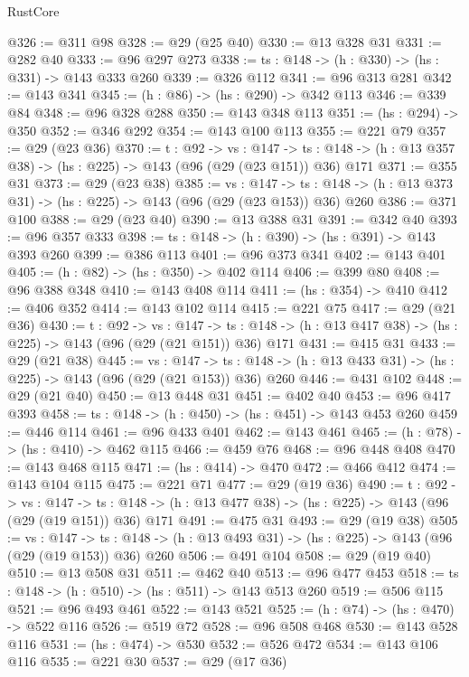 \begin{lexlean}{RustCore}
\begin{coremodule}
{\begin{coremodule}
{{{@326 := @311 @98
@328 := @29 (@25 @40)
@330 := @13 @328 @31
@331 := @282 @40
@333 := @96 @297 @273
@338 := {ts : @148} -> (h : @330) -> (hs : @331) -> @143 @333 @260
@339 := @326 @112
@341 := @96 @313 @281
@342 := @143 @341
@345 := (h : @86) -> (hs : @290) -> @342 @113
@346 := @339 @84
@348 := @96 @328 @288
@350 := @143 @348 @113
@351 := (hs : @294) -> @350
@352 := @346 @292
@354 := @143 @100 @113
@355 := @221 @79
@357 := @29 (@23 @36)
@370 := {t : @92} ->
  {vs : @147} ->
  {ts : @148} -> (h : @13 @357 @38) -> (hs : @225) -> @143 (@96 (@29 (@23 @151)) @36) @171
@371 := @355 @31
@373 := @29 (@23 @38)
@385 := {vs : @147} ->
  {ts : @148} -> (h : @13 @373 @31) -> (hs : @225) -> @143 (@96 (@29 (@23 @153)) @36) @260
@386 := @371 @100
@388 := @29 (@23 @40)
@390 := @13 @388 @31
@391 := @342 @40
@393 := @96 @357 @333
@398 := {ts : @148} -> (h : @390) -> (hs : @391) -> @143 @393 @260
@399 := @386 @113
@401 := @96 @373 @341
@402 := @143 @401
@405 := (h : @82) -> (hs : @350) -> @402 @114
@406 := @399 @80
@408 := @96 @388 @348
@410 := @143 @408 @114
@411 := (hs : @354) -> @410
@412 := @406 @352
@414 := @143 @102 @114
@415 := @221 @75
@417 := @29 (@21 @36)
@430 := {t : @92} ->
  {vs : @147} ->
  {ts : @148} -> (h : @13 @417 @38) -> (hs : @225) -> @143 (@96 (@29 (@21 @151)) @36) @171
@431 := @415 @31
@433 := @29 (@21 @38)
@445 := {vs : @147} ->
  {ts : @148} -> (h : @13 @433 @31) -> (hs : @225) -> @143 (@96 (@29 (@21 @153)) @36) @260
@446 := @431 @102
@448 := @29 (@21 @40)
@450 := @13 @448 @31
@451 := @402 @40
@453 := @96 @417 @393
@458 := {ts : @148} -> (h : @450) -> (hs : @451) -> @143 @453 @260
@459 := @446 @114
@461 := @96 @433 @401
@462 := @143 @461
@465 := (h : @78) -> (hs : @410) -> @462 @115
@466 := @459 @76
@468 := @96 @448 @408
@470 := @143 @468 @115
@471 := (hs : @414) -> @470
@472 := @466 @412
@474 := @143 @104 @115
@475 := @221 @71
@477 := @29 (@19 @36)
@490 := {t : @92} ->
  {vs : @147} ->
  {ts : @148} -> (h : @13 @477 @38) -> (hs : @225) -> @143 (@96 (@29 (@19 @151)) @36) @171
@491 := @475 @31
@493 := @29 (@19 @38)
@505 := {vs : @147} ->
  {ts : @148} -> (h : @13 @493 @31) -> (hs : @225) -> @143 (@96 (@29 (@19 @153)) @36) @260
@506 := @491 @104
@508 := @29 (@19 @40)
@510 := @13 @508 @31
@511 := @462 @40
@513 := @96 @477 @453
@518 := {ts : @148} -> (h : @510) -> (hs : @511) -> @143 @513 @260
@519 := @506 @115
@521 := @96 @493 @461
@522 := @143 @521
@525 := (h : @74) -> (hs : @470) -> @522 @116
@526 := @519 @72
@528 := @96 @508 @468
@530 := @143 @528 @116
@531 := (hs : @474) -> @530
@532 := @526 @472
@534 := @143 @106 @116
@535 := @221 @30
@537 := @29 (@17 @36)
}}}
\end{coremodule}}
\end{coremodule}
\end{lexlean}
